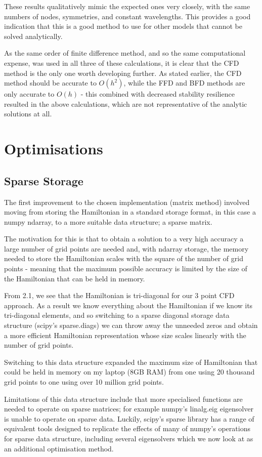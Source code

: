 These results qualitatively mimic the expected ones very closely, with the same numbers of nodes, symmetries, and constant wavelengths. This provides a good indication that this is a good method to use for other models that cannot be solved analytically.

As the same order of finite difference method, and so the same computational expense, was used in all three of these calculations, it is clear that the CFD method is the only one worth developing further. As stated earlier, the CFD method should be accurate to $O(h^{2})$, while the FFD and BFD methods are only accurate to $O(h)$ - this combined with decreased stability resilience resulted in the above calculations, which are not representative of the analytic solutions at all.

\section{Optimisations}

\subsection{Sparse Storage}
The first improvement to the chosen implementation (matrix method) involved moving from storing the Hamiltonian in a standard storage format, in this case a numpy ndarray, to a more suitable data structure; a sparse matrix. 

The motivation for this is that to obtain a solution to a very high accuracy a large number of grid points are needed and, with ndarray storage, the memory needed to store the Hamiltonian scales with the square of the number of grid points - meaning that the maximum possible accuracy is limited by the size of the Hamiltonian that can be held in memory. 

From 2.1, we see that the Hamiltonian is tri-diagonal for our 3 point CFD approach. As a result we know everything about the Hamiltonian if we know its tri-diagonal elements, and so switching to a sparse diagonal storage data structure (scipy's sparse.diags) we can throw away the unneeded zeros and obtain a more efficient Hamiltonian representation whose size scales linearly with the number of grid points. 

Switching to this data structure expanded the maximum size of Hamiltonian that could be held in memory on my laptop (8GB RAM) from one using 20 thousand grid points to one using over 10 million grid points.

Limitations of this data structure include that more specialised functions are needed to operate on sparse matrices; for example numpy's linalg.eig eigensolver is unable to operate on sparse data. Luckily, scipy's sparse library has a range of equivalent tools designed to replicate the effects of many of numpy's operations for sparse data structure, including several eigensolvers which we now look at as an additional optimisation method.

